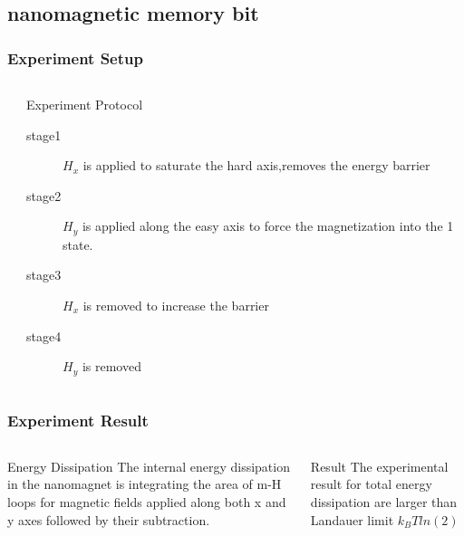 \documentclass[aspectratio=169,10pt]{beamer}
\begin{document}
\subsection{nanomagnetic memory bit}
\begin{frame}
    \frametitle{Experiment Setup}
    \begin{columns}
        \begin{column}{0.5\textwidth}
            \centering
        \end{column}
        \begin{column}{0.5\textwidth}
            \centering
            \begin{block}{Experiment Protocol\cite{hong2016experimental}}
                \begin{description}
                    \item[stage1] $H_x$ is applied to saturate the hard axis,removes the energy barrier
                    \item[stage2] $H_y$ is applied along the easy axis to force the magnetization into the 1 state.
                    \item[stage3] $H_x$ is removed to increase the barrier
                    \item[stage4] $H_y$ is removed
                \end{description}
            \end{block}
        \end{column}
    \end{columns}
\end{frame}
\begin{frame}
    \frametitle{Experiment Result}
    \begin{columns}
        \begin{column}{0.7\textwidth}
            \centering
            \begin{block}{Energy Dissipation}
                The internal energy dissipation in the nanomagnet is integrating the area of m-H loops for magnetic fields
                applied along both x and y axes followed by their subtraction.
                
            \end{block}
        \end{column}
        \begin{column}{0.3\textwidth}
            \begin{block}{Result}
                The experimental result for total energy dissipation are larger than Landauer limit $k_BTln(2)$
            \end{block}
        \end{column}
    \end{columns}
\end{frame}
\end{document}
